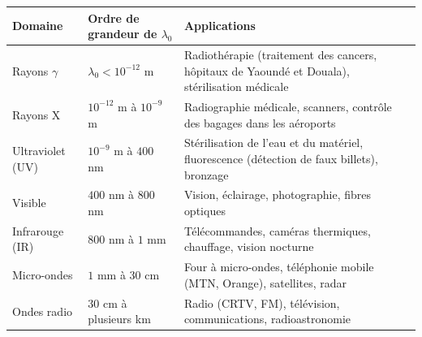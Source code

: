 \documentclass[11pt]{article}
\begin{document}
\begin{center}
\begin{tabularx}{\linewidth}{|l|l|X|}
\hline
\rowcolor{popblueL} \textbf{Domaine} & \textbf{Ordre de grandeur de $\lambda_0$} & \textbf{Applications} \\
\hline
Rayons $\gamma$ & $\lambda_0 < 10^{-12}$ m & Radiothérapie (traitement des cancers, hôpitaux de Yaoundé et Douala), stérilisation médicale \\
\hline
Rayons X & $10^{-12}$ m à $10^{-9}$ m & Radiographie médicale, scanners, contrôle des bagages dans les aéroports \\
\hline
Ultraviolet (UV) & $10^{-9}$ m à $400$ nm & Stérilisation de l'eau et du matériel, fluorescence (détection de faux billets), bronzage \\
\hline
Visible & $400$ nm à $800$ nm & Vision, éclairage, photographie, fibres optiques \\
\hline
Infrarouge (IR) & $800$ nm à $1$ mm & Télécommandes, caméras thermiques, chauffage, vision nocturne \\
\hline
Micro-ondes & $1$ mm à $30$ cm & Four à micro-ondes, téléphonie mobile (MTN, Orange), satellites, radar \\
\hline
Ondes radio & $30$ cm à plusieurs km & Radio (CRTV, FM), télévision, communications, radioastronomie \\
\hline
\end{tabularx}
\end{center}
\end{document}
